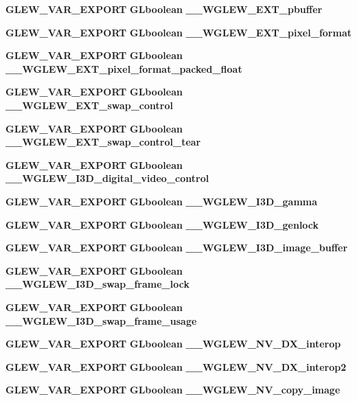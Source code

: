 \begin{DoxyCompactItemize}
{\bf G\+L\+E\+W\+\_\+\+V\+A\+R\+\_\+\+E\+X\+P\+O\+RT} {\bf G\+Lboolean} {\bf \+\_\+\+\_\+\+W\+G\+L\+E\+W\+\_\+\+E\+X\+T\+\_\+pbuffer}
\item 
{\bf G\+L\+E\+W\+\_\+\+V\+A\+R\+\_\+\+E\+X\+P\+O\+RT} {\bf G\+Lboolean} {\bf \+\_\+\+\_\+\+W\+G\+L\+E\+W\+\_\+\+E\+X\+T\+\_\+pixel\+\_\+format}
\item 
{\bf G\+L\+E\+W\+\_\+\+V\+A\+R\+\_\+\+E\+X\+P\+O\+RT} {\bf G\+Lboolean} {\bf \+\_\+\+\_\+\+W\+G\+L\+E\+W\+\_\+\+E\+X\+T\+\_\+pixel\+\_\+format\+\_\+packed\+\_\+float}
\item 
{\bf G\+L\+E\+W\+\_\+\+V\+A\+R\+\_\+\+E\+X\+P\+O\+RT} {\bf G\+Lboolean} {\bf \+\_\+\+\_\+\+W\+G\+L\+E\+W\+\_\+\+E\+X\+T\+\_\+swap\+\_\+control}
\item 
{\bf G\+L\+E\+W\+\_\+\+V\+A\+R\+\_\+\+E\+X\+P\+O\+RT} {\bf G\+Lboolean} {\bf \+\_\+\+\_\+\+W\+G\+L\+E\+W\+\_\+\+E\+X\+T\+\_\+swap\+\_\+control\+\_\+tear}
\item 
{\bf G\+L\+E\+W\+\_\+\+V\+A\+R\+\_\+\+E\+X\+P\+O\+RT} {\bf G\+Lboolean} {\bf \+\_\+\+\_\+\+W\+G\+L\+E\+W\+\_\+\+I3\+D\+\_\+digital\+\_\+video\+\_\+control}
\item 
{\bf G\+L\+E\+W\+\_\+\+V\+A\+R\+\_\+\+E\+X\+P\+O\+RT} {\bf G\+Lboolean} {\bf \+\_\+\+\_\+\+W\+G\+L\+E\+W\+\_\+\+I3\+D\+\_\+gamma}
\item 
{\bf G\+L\+E\+W\+\_\+\+V\+A\+R\+\_\+\+E\+X\+P\+O\+RT} {\bf G\+Lboolean} {\bf \+\_\+\+\_\+\+W\+G\+L\+E\+W\+\_\+\+I3\+D\+\_\+genlock}
\item 
{\bf G\+L\+E\+W\+\_\+\+V\+A\+R\+\_\+\+E\+X\+P\+O\+RT} {\bf G\+Lboolean} {\bf \+\_\+\+\_\+\+W\+G\+L\+E\+W\+\_\+\+I3\+D\+\_\+image\+\_\+buffer}
\item 
{\bf G\+L\+E\+W\+\_\+\+V\+A\+R\+\_\+\+E\+X\+P\+O\+RT} {\bf G\+Lboolean} {\bf \+\_\+\+\_\+\+W\+G\+L\+E\+W\+\_\+\+I3\+D\+\_\+swap\+\_\+frame\+\_\+lock}
\item 
{\bf G\+L\+E\+W\+\_\+\+V\+A\+R\+\_\+\+E\+X\+P\+O\+RT} {\bf G\+Lboolean} {\bf \+\_\+\+\_\+\+W\+G\+L\+E\+W\+\_\+\+I3\+D\+\_\+swap\+\_\+frame\+\_\+usage}
\item 
{\bf G\+L\+E\+W\+\_\+\+V\+A\+R\+\_\+\+E\+X\+P\+O\+RT} {\bf G\+Lboolean} {\bf \+\_\+\+\_\+\+W\+G\+L\+E\+W\+\_\+\+N\+V\+\_\+\+D\+X\+\_\+interop}
\item 
{\bf G\+L\+E\+W\+\_\+\+V\+A\+R\+\_\+\+E\+X\+P\+O\+RT} {\bf G\+Lboolean} {\bf \+\_\+\+\_\+\+W\+G\+L\+E\+W\+\_\+\+N\+V\+\_\+\+D\+X\+\_\+interop2}
\item 
{\bf G\+L\+E\+W\+\_\+\+V\+A\+R\+\_\+\+E\+X\+P\+O\+RT} {\bf G\+Lboolean} {\bf \+\_\+\+\_\+\+W\+G\+L\+E\+W\+\_\+\+N\+V\+\_\+copy\+\_\+image}

\end{DoxyCompactItemize}
